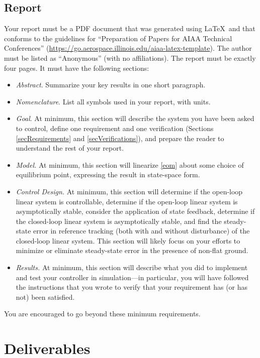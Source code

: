 \documentclass[conf]{new-aiaa}
\begin{document}
\subsection{Report}
\label{report}

Your report must be a PDF document that was generated using \LaTeX\ and that conforms to the guidelines for ``Preparation of Papers for AIAA Technical Conferences'' (\url{https://go.aerospace.illinois.edu/aiaa-latex-template}). The author must be listed as ``Anonymous'' (with no affiliations). The report must be exactly four pages. It must have the following sections:
\begin{itemize}
\item {\em Abstract}. Summarize your key results in one short paragraph.
\item {\em Nomenclature}. List all symbols used in your report, with units.
\item {\em Goal}. At minimum, this section will describe the system you have been asked to control, define one requirement and one verification (Sections \ref{secRequirements} and \ref{secVerifications}), and prepare the reader to understand the rest of your report.
\item {\em Model.} At minimum, this section will linearize \eqref{eom} about some choice of equilibrium point, expressing the result in state-space form.
\item {\em Control Design.} At minimum, this section will determine if the open-loop linear system is controllable, determine if the open-loop linear system is asymptotically stable, consider the application of state feedback, determine if the closed-loop linear system is asymptotically stable, and find the steady-state error in reference tracking (both with and without disturbance) of the closed-loop linear system. This section will likely focus on your efforts to minimize or eliminate steady-state error in the presence of non-flat ground.
\item {\em Results.} At minimum, this section will describe what you did to implement and test your controller in simulation---in particular, you will have followed the instructions that you wrote to verify that your requirement has (or has not) been satisfied.
\end{itemize}
You are encouraged to go beyond these minimum requirements.

\section{Deliverables}
\end{document}
